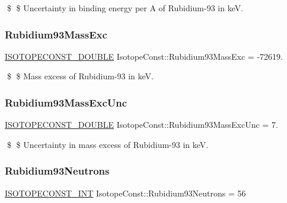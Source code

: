 \$ \$ Uncertainty in binding energy per A of Rubidium-\/93 in keV. \mbox{\label{group___isotope_const-_rubidium-_rb93_gaba49e934699a6609235c308c21298048}} 
\subsubsection{\texorpdfstring{Rubidium93\+Mass\+Exc}{Rubidium93MassExc}}
{\footnotesize\ttfamily \mbox{\hyperlink{group___isotope_const-_macros_ga8f45a7272ce02c0b4c65c44636ed719a}{I\+S\+O\+T\+O\+P\+E\+C\+O\+N\+S\+T\+\_\+\+D\+O\+U\+B\+LE}} Isotope\+Const\+::\+Rubidium93\+Mass\+Exc = -\/72619.}

\$ \$ Mass excess of Rubidium-\/93 in keV. \mbox{\label{group___isotope_const-_rubidium-_rb93_gaaa07b7a6fe7d813314214a29156ef928}} 
\subsubsection{\texorpdfstring{Rubidium93\+Mass\+Exc\+Unc}{Rubidium93MassExcUnc}}
{\footnotesize\ttfamily \mbox{\hyperlink{group___isotope_const-_macros_ga8f45a7272ce02c0b4c65c44636ed719a}{I\+S\+O\+T\+O\+P\+E\+C\+O\+N\+S\+T\+\_\+\+D\+O\+U\+B\+LE}} Isotope\+Const\+::\+Rubidium93\+Mass\+Exc\+Unc = 7.}

\$ \$ Uncertainty in mass excess of Rubidium-\/93 in keV. \mbox{\label{group___isotope_const-_rubidium-_rb93_ga4727d6620eb848434df82fe4a7308075}} 
\subsubsection{\texorpdfstring{Rubidium93\+Neutrons}{Rubidium93Neutrons}}
{\footnotesize\ttfamily \mbox{\hyperlink{group___isotope_const-_macros_ga5f18360b3e99483a35c32d789e62621c}{I\+S\+O\+T\+O\+P\+E\+C\+O\+N\+S\+T\+\_\+\+I\+NT}} Isotope\+Const\+::\+Rubidium93\+Neutrons = 56}

